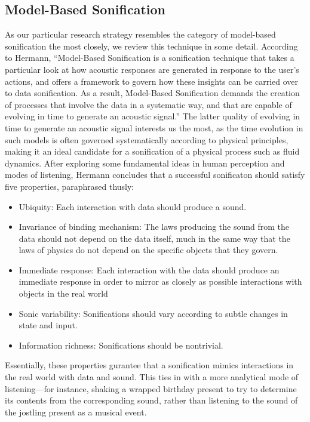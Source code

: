 \subsection{Model-Based Sonification}
\label{sec:modelbased}
As our particular research strategy resembles the category of model-based sonification the most closely, we review this technique in some detail.
According to Hermann, ``Model-Based Sonification is a sonification technique that takes a
particular look at how acoustic responses are generated in response to the user’s actions, and
offers a framework to govern how these insights can be carried over to data sonification. As
a result, Model-Based Sonification demands the creation of processes that involve the data in
a systematic way, and that are capable of evolving in time to generate an acoustic signal.'' \cite{hermann2011sonification} The latter quality of evolving in time to generate an acoustic signal interests us the most, as the time evolution in such models is often governed systematically according to physical principles, making it an ideal candidate for a sonification of a physical process such as fluid dynamics. After exploring some fundamental ideas in human perception and modes of listening, Hermann concludes that a successful sonificaton should satisfy five properties, paraphrased thusly:
\begin{itemize}
	\item Ubiquity: Each interaction with data should produce a sound.
	\item Invariance of binding mechanism: The laws producing the sound from the data should not depend on the data itself, much in the same way that the
	laws of physics do not depend on the specific objects that they govern.
	\item Immediate response: Each interaction with the data should produce an immediate response in order to mirror as closely as possible interactions with objects in the real world
	\item Sonic variability: Sonifications should vary according to subtle changes in state and input.
	\item Information richness: Sonifications should be nontrivial.
\end{itemize}
Essentially, these properties gurantee that a sonification mimics interactions in the real world with data and sound. This ties in with a more analytical mode of listening---for instance, shaking a wrapped birthday present to try to determine its contents from the corresponding sound, rather than listening to the sound of the jostling present as a musical event.


